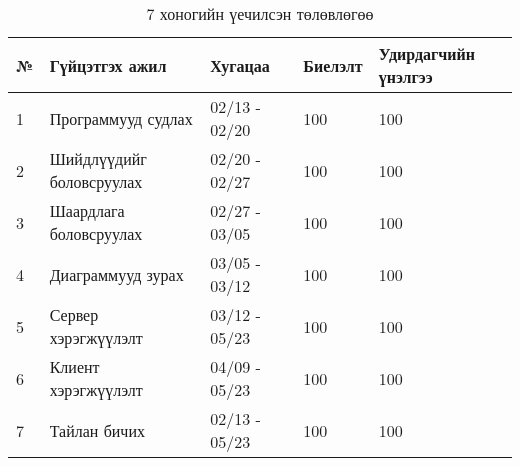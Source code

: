 \begin{table}[h]
\caption{7 хоногийн үечилсэн төлөвлөгөө}
\begin{tabular}{|p{0.5cm}|p{8cm}|l|l|p{3cm}|}
\hline
\textbf{№} & \textbf{Гүйцэтгэх ажил} & \textbf{Хугацаа} & \textbf{Биелэлт} & \textbf{Удирдагчийн үнэлгээ} \\ \hline
1 & Программууд судлах & 02/13 - 02/20 & 100 & 100 \\ \hline
2 & Шийдлүүдийг боловсруулах & 02/20 - 02/27 & 100 & 100 \\ \hline
3 & Шаардлага боловсруулах & 02/27 - 03/05 & 100 & 100 \\ \hline
4 & Диаграммууд зурах & 03/05 - 03/12 & 100 & 100 \\ \hline
5 & Сервер хэрэгжүүлэлт  & 03/12 - 05/23 & 100 & 100 \\ \hline
6 & Клиент хэрэгжүүлэлт & 04/09 - 05/23 & 100 & 100 \\ \hline
7 & Тайлан бичих & 02/13 - 05/23 & 100 & 100\\ \hline
\end{tabular}
\end{table}
